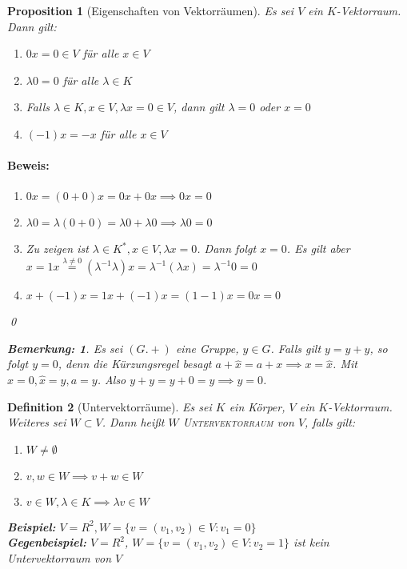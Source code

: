 \documentclass{report}
\newcommand{\IN}[1]{\index{#1|BH}}
\newcommand{\lb}{\lambda}
\theoremstyle{customrem}
\newtheorem*{bemerkung}{Bemerkung\textnormal:}
\theoremstyle{customdef}
\newtheorem{definition}{Definition}[chapter]
\newtheorem{proposition}[definition]{Proposition}
\renewenvironment{proof}{\paragraph{Beweis: }}{\qed}
\theoremstyle{customenv}
\newcommand{\defemph}[1]{\textsc{#1}}
\begin{document}
	\begin{proposition}[Eigenschaften von Vektorräumen]
		Es sei \(V\) ein \(K\)-Vektorraum. Dann gilt:
		\begin{enumerate}[leftmargin=4cm]
			\itemsep0cm
			\item \(0 x = 0 \in V\) für alle \(x \in V\)
			\item \(\lb 0 = 0\) für alle \(\lb \in K\)
			\item Falls \(\lb \in K, x \in V, \lb x = 0 \in V\), dann gilt \(\lb = 0\) oder \(x = 0\)
			\item \((-1) x = -x\) für alle \(x \in V\)
		\end{enumerate}
		\begin{proof}
			\begin{enumerate}
				\itemsep0cm
				\item \(0 x = (0 + 0)x = 0x + 0x \implies 0x = 0\)
				\item \(\lb 0 = \lb(0 + 0) = \lb 0 + \lb 0 \implies \lb 0 = 0\)
				\item Zu zeigen ist \(\lb \in K^\ast, x \in V, \lb x = 0\). Dann folgt \(x = 0\). Es gilt aber \(x = 1 x \overset{\lb \neq 0}{=} (\lb ^{-1} \lb) x = \lb^{-1}(\lb x) = \lb^{-1} 0 = 0\)
				\item \(x + (-1) x = 1x + (-1) x = (1 - 1)  x = 0 x = 0\)
			\end{enumerate}
		\end{proof}
		\begin{bemerkung}
			Es sei \((G. +)\) eine Gruppe, \(y \in G\). Falls gilt \(y = y + y\), so folgt \(y = 0\), denn die Kürzungsregel besagt \(a + \hat{x} = a+x \implies x = \hat{x}\). Mit \(x = 0, \hat{x} = y, a = y\). Also \(y +y = y + 0 = y \implies y = 0\).
		\end{bemerkung}
	\end{proposition}
	
	\begin{definition}[Untervektorräume]
		\IN{Untervektorraum}
		Es sei \(K\) ein Körper, \(V\) ein \(K\)-Vektorraum. Weiteres sei \(W \subset V\). Dann heißt \(W\) \defemph{Untervektorraum} von \(V\), falls gilt:
		
		\begin{enumerate}[leftmargin=4cm]
			\itemsep0cm
			\item \(W \neq \emptyset\) 
			\item \(v, w \in W \implies v + w \in W\)
			\item \(v \in W, \lb \in K \implies \lb v \in W\)
		\end{enumerate}
		
		\textbf{Beispiel:}
		\(V = R^2, W = \{v = (v_1, v_2) \in V : v_1 = 0\}\)\\
		\textbf{Gegenbeispiel:}
		\(V = R^2\), \(W = \{v = (v_1, v_2) \in V : v_2 = 1\}\) ist kein Untervektorraum von \(V\)
	\end{definition}
	
\end{document}
